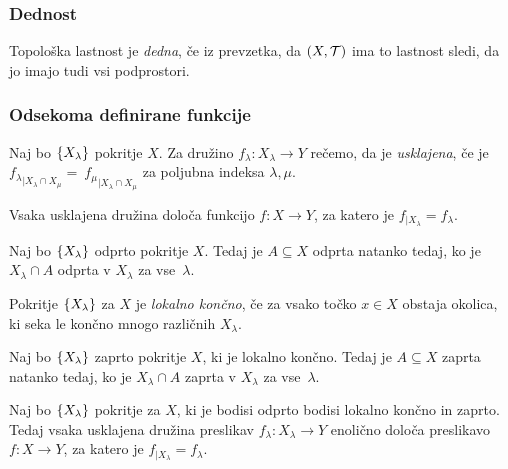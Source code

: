 \subsubsection{Dednost}
\begin{definicija}
    Topološka lastnost je \emph{dedna}, če iz prevzetka, da $(X, \mathcal{T})$ ima to lastnost sledi, da jo imajo tudi vsi podprostori.
\end{definicija}

\subsubsection{Odsekoma definirane funkcije}

\begin{definicija}
    Naj bo $\left\{X_\lambda\right\}$ pokritje $X$. Za družino $f_\lambda: X_\lambda \to Y$ rečemo, da je \emph{usklajena}, če je ${f_\lambda}_{|X_\lambda \cap X_\mu} =~{f_\mu}_{|X_\lambda \cap X_\mu}$ za poljubna indeksa $\lambda, \mu$.
\end{definicija}

\begin{trditev}
    Vsaka usklajena družina določa funkcijo $f: X \to Y$, za katero je $f_{|X_\lambda} = f_\lambda$.
\end{trditev}

\begin{lema}
    Naj bo $\left\{X_\lambda\right\}$ odprto pokritje $X$. Tedaj je $A \subseteq X$ odprta natanko tedaj, ko je $X_\lambda \cap A$ odprta v $X_\lambda$ za vse~$\lambda$.
\end{lema}

\begin{definicija}
    Pokritje $\left\{X_\lambda\right\}$ za $X$ je \emph{lokalno končno}, če za vsako točko $x \in X$ obstaja okolica, ki seka le končno mnogo različnih $X_\lambda$.
\end{definicija}

\begin{lema}
    Naj bo $\left\{X_\lambda\right\}$ zaprto pokritje $X$, ki je lokalno končno. Tedaj je $A \subseteq X$ zaprta natanko tedaj, ko je $X_\lambda \cap A$ zaprta v $X_\lambda$ za vse~$\lambda$.
\end{lema}

\begin{izrek}
    Naj bo $\left\{X_\lambda\right\}$ pokritje za $X$, ki je bodisi odprto bodisi lokalno končno in zaprto. Tedaj vsaka usklajena družina preslikav $f_\lambda: X_\lambda \to Y$ enolično določa preslikavo $f: X \to Y$, za katero je $f_{|X_\lambda} = f_\lambda$.
\end{izrek}

